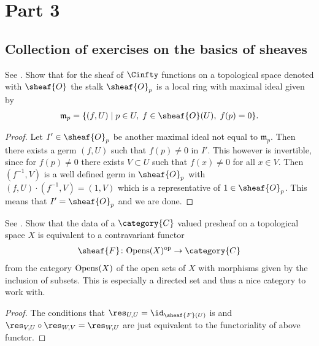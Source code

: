 \chapter{Part 3}

\section{Collection of exercises on the basics of sheaves}

\begin{exercise}[2.1.A]
  See \cite[2.1.A]{vakil2024the-rising-sea}.
  Show that for the sheaf of $\Cinfty$ functions on a topological
  space denoted with $\sheaf{O}$ the stalk $\sheaf{O}_p$ is a local
  ring with maximal ideal given by
  \begin{align*}
    \mathfrak{m}_{p} = \{(f, U)\mid p\in U,\; f\in \sheaf{O}(U), \; f(p)=0\}.
  \end{align*}
\end{exercise}

\begin{proof}
  Let $I'\in \sheaf{O}_p$ be another maximal ideal not equal to
  $\mathfrak{m}_p$. Then there exists a germ $(f, U)$ such that
  $f(p)\neq 0$ in $I'$. This however is invertible, since for
  $f(p)\neq 0$ there exists $V\subset U$ such that $f(x)\neq 0$ for
  all $x\in V$. Then $(f^{-1},V)$ is a well defined germ in
  $\sheaf{O}_p$ with $(f,U)\cdot (f^{-1},V) = (1,V)$ which is a
  representative of $1\in \sheaf{O}_p$. This means that $I' =
  \sheaf{O}_p$ and we are done. 
\end{proof}

\begin{exercise}[2.2.A]
  See \cite[2.2.A]{vakil2024the-rising-sea}.
  Show that the data of a $\category{C}$ valued presheaf on a topological space $X$ is
  equivalent to a contravariant functor
  \begin{align*}
    \sheaf{F}\colon \Opens(X)^\op \rightarrow \category{C}
  \end{align*}
  from the category $\mathrm{Opens}(X)$ of the open sets of $X$ with morphisms
  given by the inclusion of subsets. This is especially a directed set
  and thus a nice category to work with.
\end{exercise}

\begin{proof}
  The conditions that $\res_{U,U}= \id_{\sheaf{F}(U)}$ is and
  $\res_{V,U}\circ\res_{W,V}= \res_{W,U}$ are just equivalent to the
  functoriality of above functor.
\end{proof}

